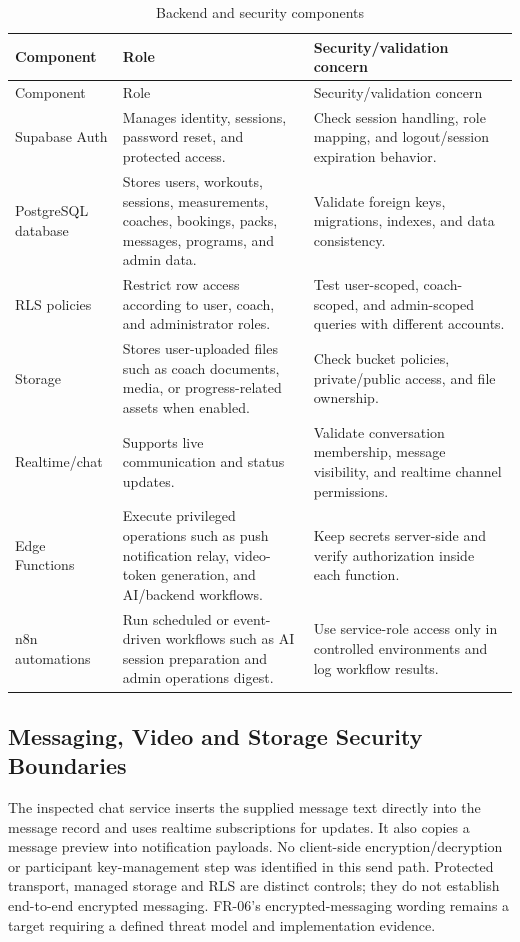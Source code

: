 \documentclass[12pt,a4paper,openany]{report}
\begin{document}
\begingroup
\footnotesize
\setlength{\tabcolsep}{3pt}
\renewcommand{\arraystretch}{1.20}
\setlength{\LTpre}{5pt}
\setlength{\LTpost}{10pt}
\begin{longtable}{|L{3.67cm}|L{5.29cm}|L{5.73cm}|}
\caption{Backend and security components}\label{tab:pdf-94-45} \\
\hline
{}
Component & Role & Security/validation concern \\ \hline
\endfirsthead
\hline
{}
Component & Role & Security/validation concern \\ \hline
\endhead
Supabase Auth & Manages identity, sessions, password reset, and protected access. & Check session handling, role mapping, and logout/session expiration behavior. \\ \hline
PostgreSQL database & Stores users, workouts, sessions, measurements, coaches, bookings, packs, messages, programs, and admin data. & Validate foreign keys, migrations, indexes, and data consistency. \\ \hline
RLS policies & Restrict row access according to user, coach, and administrator roles. & Test user-scoped, coach-scoped, and admin-scoped queries with different accounts. \\ \hline
Storage & Stores user-uploaded files such as coach documents, media, or progress-related assets when enabled. & Check bucket policies, private/public access, and file ownership. \\ \hline
Realtime/chat & Supports live communication and status updates. & Validate conversation membership, message visibility, and realtime channel permissions. \\ \hline
Edge Functions & Execute privileged operations such as push notification relay, video-token generation, and AI/backend workflows. & Keep secrets server-side and verify authorization inside each function. \\ \hline
n8n automations & Run scheduled or event-driven workflows such as AI session preparation and admin operations digest. & Use service-role access only in controlled environments and log workflow results. \\ \hline
\end{longtable}
\endgroup

\subsection{Messaging, Video and Storage Security Boundaries}

The inspected chat service inserts the supplied message text directly into the message record and uses realtime subscriptions for updates. It also copies a message preview into notification payloads. No client-side encryption/decryption or participant key-management step was identified in this send path. Protected transport, managed storage and RLS are distinct controls; they do not establish end-to-end encrypted messaging. FR-06's encrypted-messaging wording remains a target requiring a defined threat model and implementation evidence.
\end{document}
